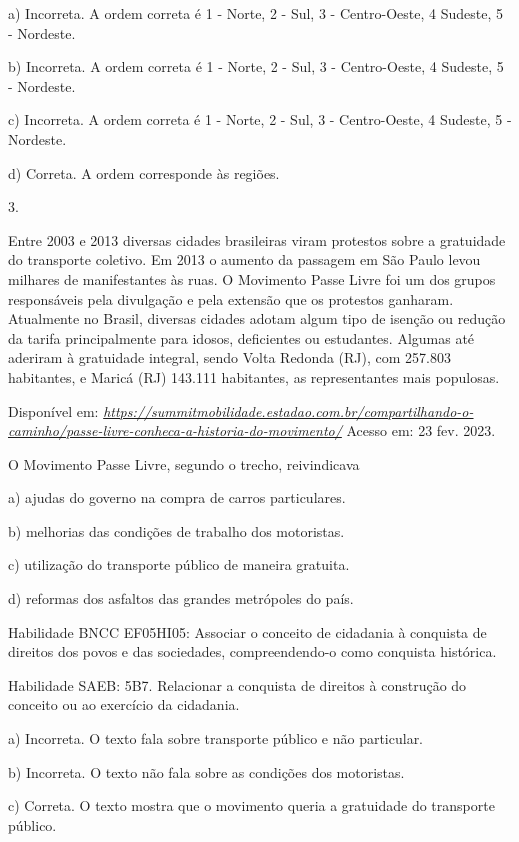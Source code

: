 a) Incorreta. A ordem correta é 1 - Norte, 2 - Sul, 3 - Centro-Oeste, 4
Sudeste, 5 - Nordeste.

b) Incorreta. A ordem correta é 1 - Norte, 2 - Sul, 3 - Centro-Oeste, 4
Sudeste, 5 - Nordeste.

c) Incorreta. A ordem correta é 1 - Norte, 2 - Sul, 3 - Centro-Oeste, 4
Sudeste, 5 - Nordeste.

d) Correta. A ordem corresponde às regiões.

3.

Entre 2003 e 2013 diversas cidades brasileiras viram protestos sobre a
gratuidade do transporte coletivo. Em 2013 o aumento da passagem em São
Paulo levou milhares de manifestantes às ruas. O Movimento Passe Livre
foi um dos grupos responsáveis pela divulgação e pela extensão que os
protestos ganharam. Atualmente no Brasil, diversas cidades adotam algum
tipo de isenção ou redução da tarifa principalmente para idosos,
deficientes ou estudantes. Algumas até aderiram à gratuidade integral,
sendo Volta Redonda (RJ), com 257.803 habitantes, e Maricá (RJ) 143.111
habitantes, as representantes mais populosas.

Disponível em:
\href{https://summitmobilidade.estadao.com.br/compartilhando-o-caminho/passe-livre-conheca-a-historia-do-movimento/}{\emph{https://summitmobilidade.estadao.com.br/compartilhando-o-caminho/passe-livre-conheca-a-historia-do-movimento/}}
Acesso em: 23 fev. 2023.

O Movimento Passe Livre, segundo o trecho, reivindicava

a) ajudas do governo na compra de carros particulares.

b) melhorias das condições de trabalho dos motoristas.

c) utilização do transporte público de maneira gratuita.

d) reformas dos asfaltos das grandes metrópoles do país.

Habilidade BNCC EF05HI05: Associar o conceito de cidadania à conquista
de direitos dos povos e das sociedades, compreendendo-o como conquista
histórica.

Habilidade SAEB: 5B7. Relacionar a conquista de direitos à construção do
conceito ou ao exercício da cidadania.

a) Incorreta. O texto fala sobre transporte público e não particular.

b) Incorreta. O texto não fala sobre as condições dos motoristas.

c) Correta. O texto mostra que o movimento queria a gratuidade do
transporte público.

